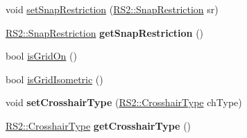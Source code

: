 \begin{DoxyCompactItemize}
\item 
void \hyperlink{classRS__GraphicView_a329a89b5d28af0c1b62c62fee469cc9b}{set\-Snap\-Restriction} (\hyperlink{classRS2_aac67b6890a08cff619c0fbef48377bae}{R\-S2\-::\-Snap\-Restriction} sr)
\item 
\hypertarget{classRS__GraphicView_afe2387cea74def223dabd7e1c20eb6e1}{\hyperlink{classRS2_aac67b6890a08cff619c0fbef48377bae}{R\-S2\-::\-Snap\-Restriction} {\bfseries get\-Snap\-Restriction} ()}\label{classRS__GraphicView_afe2387cea74def223dabd7e1c20eb6e1}

\item 
bool \hyperlink{classRS__GraphicView_a9534cdc415ffe121e5324c8c2101b7dc}{is\-Grid\-On} ()
\item 
bool \hyperlink{classRS__GraphicView_a412f59054fb3383d3a98efec75af1e16}{is\-Grid\-Isometric} ()
\item 
\hypertarget{classRS__GraphicView_aaa4a8d5eb903146dbb61105f49b9f382}{void {\bfseries set\-Crosshair\-Type} (\hyperlink{classRS2_a6900d729544a78e6cda74f93df772acc}{R\-S2\-::\-Crosshair\-Type} ch\-Type)}\label{classRS__GraphicView_aaa4a8d5eb903146dbb61105f49b9f382}

\item 
\hypertarget{classRS__GraphicView_a221e6cdf801e6220eb97f801e48e3969}{\hyperlink{classRS2_a6900d729544a78e6cda74f93df772acc}{R\-S2\-::\-Crosshair\-Type} {\bfseries get\-Crosshair\-Type} ()}\label{classRS__GraphicView_a221e6cdf801e6220eb97f801e48e3969}


\end{DoxyCompactItemize}
